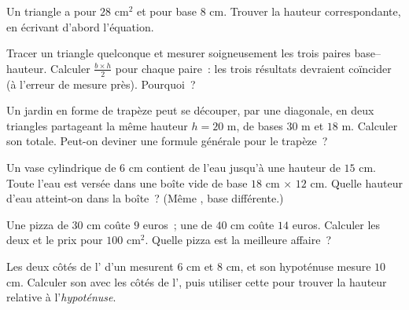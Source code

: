 \begin{exercise}[$\star$]\label{exo:g7:areas:7}
Un triangle a pour  $28$ cm$^2$ et pour base $8$ cm. Trouver la
hauteur correspondante, en écrivant d'abord l'équation.
\end{exercise}

\begin{exercise}[$\star\star$]\label{exo:g7:areas:8}
Tracer un triangle quelconque et mesurer soigneusement les trois
paires base--hauteur. Calculer $\frac{b \times h}{2}$ pour chaque
paire~: les trois résultats devraient coïncider (à l'erreur de
mesure près). Pourquoi~?
\end{exercise}

\begin{exercise}[$\star\star$]\label{exo:g7:areas:9}
Un jardin en forme de trapèze peut se découper, par une diagonale, en
deux triangles partageant la même hauteur $h = 20$ m, de bases $30$ m
et $18$ m. Calculer son  totale. Peut-on deviner une formule
générale pour le trapèze~?
\end{exercise}

\begin{exercise}[$\star\star$]\label{exo:g7:areas:10}
Un vase cylindrique de  $6$ cm contient de l'eau jusqu'à une
hauteur de $15$ cm. Toute l'eau est versée dans une boîte vide de
base $18$ cm $\times$ $12$ cm. Quelle hauteur d'eau atteint-on dans
la boîte~? (Même , base différente.)
\end{exercise}

\begin{exercise}[$\star\star$]\label{exo:g7:areas:11}
Une pizza de  $30$ cm coûte $9$ euros~; une de 
$40$ cm coûte $14$ euros. Calculer les deux  et le prix pour
$100$ cm$^2$. Quelle pizza est la meilleure affaire~?
\end{exercise}

\begin{exercise}[$\star\star\star$]\label{exo:g7:areas:12}
Les deux côtés de l' d'un  mesurent
$6$ cm et $8$ cm, et son hypoténuse mesure $10$ cm. Calculer son 
avec les côtés de l', puis utiliser cette  pour
trouver la hauteur relative à l'\emph{hypoténuse}.
\end{exercise}

